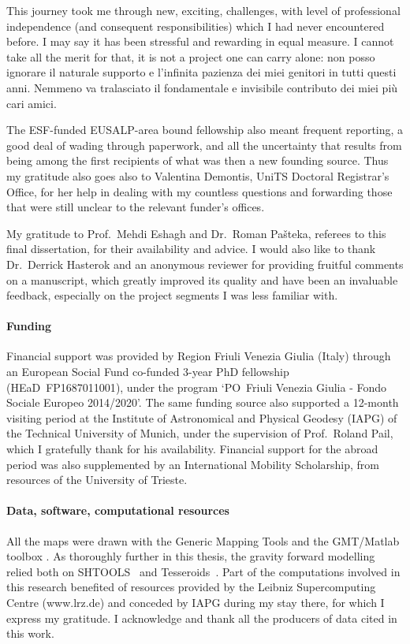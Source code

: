 \bigskip

This journey took me through new, exciting, challenges, with level of professional independence (and consequent responsibilities) which I had never encountered before.
I may say it has been stressful and rewarding in equal measure.
I cannot take all the merit for that, it is not a project one can carry alone: non posso ignorare il naturale supporto e l'infinita pazienza dei miei genitori in tutti questi anni.
Nemmeno va tralasciato il fondamentale e invisibile contributo dei miei più cari amici.

\bigskip

The {ESF}-funded {EUSALP}-area bound fellowship also meant frequent reporting, a good deal of wading through paperwork, and all the uncertainty that results from being among the first recipients of what was then a new founding source.
Thus my gratitude also goes also to Valentina Demontis, UniTS Doctoral Registrar's Office, for her help in dealing with my countless questions and forwarding those that were still unclear to the relevant funder's offices.

\bigskip

My gratitude to Prof.~Mehdi Eshagh and Dr.~Roman Pašteka, referees to this final dissertation, for their availability and advice.
I would also like to thank Dr.~Derrick Hasterok and an anonymous reviewer for providing fruitful comments on a manuscript, which greatly improved its quality and have been an invaluable feedback, especially on the project segments I was less familiar with.

\newpage
\paragraph{Funding}
Financial support was provided by Region Friuli Venezia Giulia (Italy) through an European Social Fund co-funded 3-year PhD fellowship ({HEaD}~{FP1687011001}), under the program `{{PO}~Friuli Venezia Giulia - Fondo Sociale Europeo 2014/2020}'.
The same funding source also supported a 12-month visiting period at the Institute of Astronomical and Physical Geodesy (IAPG) of the Technical University of Munich, under the supervision of Prof.~Roland Pail, which I gratefully thank for his availability.
Financial support for the abroad period was also supplemented by an International Mobility Scholarship, from resources of the University of Trieste.

\paragraph{Data, software, computational resources}
All the maps were drawn with the Generic Mapping Tools \parencite[GMT,][]{GMT2013} and the {GMT/Matlab} toolbox \parencite{GMTmex2017}.
As thoroughly further in this thesis, the gravity forward modelling relied both on {SHTOOLS}~\parencite{Wieczorek2018} and {Tesseroids}~\parencite{Uieda2016}.
Part of the computations involved in this research benefited of resources provided by the Leibniz Supercomputing Centre (www.lrz.de) and conceded by {IAPG} during my stay there, for which I express my gratitude.
I acknowledge and thank all the producers of data cited in this work.
